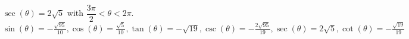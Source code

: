 {$\sec(\theta) = 2\sqrt{5}$ with $\dfrac{3\pi}{2} < \theta < 2\pi$.}
{$\sin(\theta) = -\frac{\sqrt{95}}{10}, \cos(\theta) = \frac{\sqrt{5}}{10}, \tan(\theta) = -\sqrt{19}, \csc(\theta) = -\frac{2\sqrt{95}}{19}, \sec(\theta) = 2\sqrt{5}, \cot(\theta) = -\frac{\sqrt{19}}{19}$}